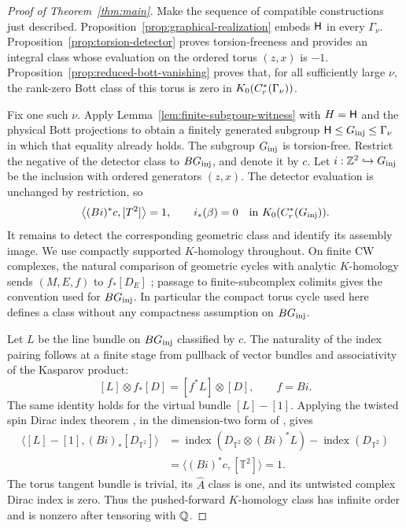 \begin{proof}[Proof of Theorem~\ref{thm:main}]
Make the sequence of compatible constructions just described.
Proposition~\ref{prop:graphical-realization} embeds $\mathsf H$ in
every $\Gamma_\nu$.
Proposition~\ref{prop:torsion-detector} proves torsion-freeness
and provides an integral class whose evaluation on the ordered
torus $(z,x)$ is $-1$.
Proposition~\ref{prop:reduced-bott-vanishing} proves that, for
all sufficiently large $\nu$, the rank-zero Bott class of this
torus is zero in $K_0(C_r^*(\Gamma_\nu))$.

Fix one such $\nu$.  Apply Lemma~\ref{lem:finite-subgroup-witness}
with $H=\mathsf H$ and the physical Bott projections to obtain a finitely
generated subgroup
$\mathsf H\leq G_{\mathrm{inj}}\leq\Gamma_\nu$ in which that equality already
holds.  The subgroup $G_{\mathrm{inj}}$ is torsion-free.  Restrict the negative
of the detector class to $BG_{\mathrm{inj}}$, and denote it by $c$.  Let
$i:\mathbb Z^2\hookrightarrow G_{\mathrm{inj}}$ be the inclusion with ordered
generators $(z,x)$.  The detector evaluation is unchanged by restriction,
so
\[
 \left\langle(Bi)^*c,[T^2]\right\rangle=1,
 \qquad i_*(\beta)=0\quad\hbox{in }K_0(C_r^*(G_{\mathrm{inj}})).
\]
It remains to detect the corresponding geometric class and identify its
assembly image.  We use compactly supported $K$-homology throughout. On finite CW
complexes, the natural comparison of geometric cycles with analytic
$K$-homology sends $(M,E,f)$ to $f_*[D_E]$
\cite[Theorems~6.1--6.2]{BHS07}; passage to finite-subcomplex colimits
gives the convention used for $BG_{\mathrm{inj}}$. In particular the compact torus
cycle used here defines a class without any compactness assumption on
$BG_{\mathrm{inj}}$.

Let $L$ be the line bundle on $BG_{\mathrm{inj}}$ classified by $c$. The naturality
of the index pairing follows at a finite stage from pullback of vector
bundles and associativity of the Kasparov product:
\[
 [L]\otimes f_*[D]=[f^*L]\otimes[D],\qquad f=Bi.
\]
The same identity holds for the virtual bundle $[L]-[1]$. Applying the
twisted spin Dirac index theorem \cite{AS63}, in the dimension-two form
of \cite[Theorem~1]{BvE16}, gives
\begin{align*}
 \bigl\langle [L]-[1],(Bi)_*[D_{\mathbb T^2}]\bigr\rangle
 &=\operatorname{index}(D_{\mathbb T^2}\otimes (Bi)^*L)
       -\operatorname{index}(D_{\mathbb T^2})\\
 &=\bigl\langle (Bi)^*c,[\mathbb T^2]\bigr\rangle=1.
\end{align*}
The torus tangent bundle is trivial, its $\widehat A$ class is one,
and its untwisted complex Dirac index is zero. Thus the pushed-forward
$K$-homology class has infinite order and is nonzero after tensoring with
$\mathbb Q$.


\end{proof}

